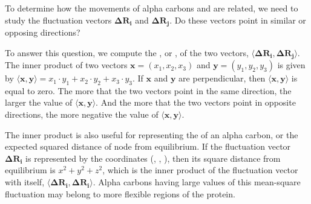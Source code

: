 To determine how the movements of alpha carbons  and  are related, we need to study the fluctuation vectors $ \mathbf{\Delta R_i} $ and $\mathbf{\Delta R_j}$. Do these vectors point in similar or opposing directions?

To answer this question, we compute the , or , of the two vectors, $ \langle \mathbf{\Delta R_i}, \mathbf{\Delta R_j} \rangle $. The inner product of two vectors $\mathbf{x} = (x_1, x_2, x_3)$ and $\mathbf{y} = (y_1, y_2, y_3)$ is given by $ \langle \mathbf{x}, \mathbf{y} \rangle = x_1 \cdot y_1 + x_2 \cdot y_2 + x_3 \cdot y_3$. If $\mathbf{x}$ and $\mathbf{y}$ are perpendicular, then $ \langle \mathbf{x}, \mathbf{y} \rangle $ is equal to zero. The more that the two vectors point in the same direction, the larger the value of $\langle \mathbf{x}, \mathbf{y} \rangle $. And the more that the two vectors point in opposite directions, the more negative the value of $\langle \mathbf{x}, \mathbf{y} \rangle $.\\

\begin{qbox}[%
	Say that $\mathbf{x} = (1, -2, 3)$, $\mathbf{y} = (2, -3, 5)$, and  $\mathbf{z} = (-1, 3, -4)$. Compute the inner products $\langle \mathbf{x}, \mathbf{y} \rangle$ and $\langle \mathbf{x}, \mathbf{z} \rangle$. Ensure that your answers match the preceding observation about the value of the inner product and the directions of vectors.
	]\end{qbox}

The inner product is also useful for representing  the  of an alpha carbon, or the expected squared distance of node  from equilibrium.  If the fluctuation vector $\mathbf{\Delta R_i}$ is represented by the coordinates (, , ), then its square distance from equilibrium is $x^2 + y^2 + z^2$, which is the inner product of the fluctuation vector with itself, $ \langle \mathbf{\Delta R_i}, \mathbf{\Delta R_i} \rangle $. Alpha carbons having large values of this mean-square fluctuation may belong to more flexible regions of the protein.\\

\begin{note}\end{note}

